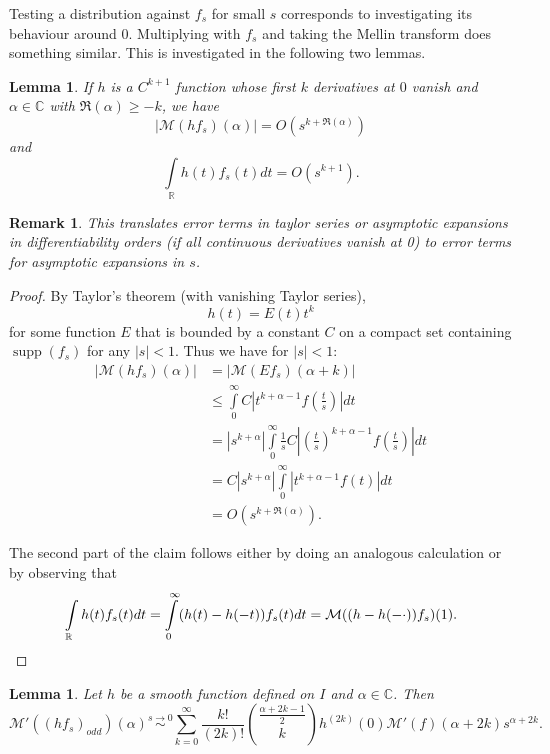 \documentclass[11pt]{article}
\def\C{{\mathbb{C}}}
\def\R{{\mathbb{R}}}
\def\insum#1{\sum\limits_{#1=0}^\infty}
\def\intR{\int\limits_\R}
\def\intP{\int\limits_0^\infty}
\def\M{\mathcal{M}}
\newtheorem{lemma}[df]{Lemma}
\newtheorem{rem}[df]{Remark}
\DeclareMathOperator{\supp}{supp}
\begin{document}
Testing a distribution against $f_s$ for small $s$ corresponds to investigating its behaviour around $0$. Multiplying with $f_s$ and taking the Mellin transform does something similar. This is investigated in the following two lemmas.
\begin{lemma}
	\label{IntRem}
	If $h$ is a $C^{k+1}$ function whose first $k$ derivatives at $0$ vanish and $\alpha\in \C$ with $\Re(\alpha)\geq -k$, we have
	\[|\M(hf_s)(\alpha)|=O(s^{k+\Re(\alpha)})\]
	and
	\[\intR h(t)f_s(t)dt=O(s^{k+1}).\]
\end{lemma}
\begin{rem}
	This translates error terms in taylor series or asymptotic expansions in differentiability orders (if all continuous derivatives vanish at 0) to error terms for asymptotic expansions in $s$. 
\end{rem}
\begin{proof}
	By Taylor's theorem (with vanishing Taylor series),
	\[h(t)= E(t)t^k\]
	for some function $E$ that is bounded by a constant $C$ on a compact set containing $\supp(f_s)$ for any $|s|<1$. Thus we have for $|s|<1$:
	\begin{align*}
		| \M (hf_s)(\alpha)|&=|\M (Ef_s)(\alpha+k)|\\
		&\leq\intP C|t^{k+\alpha-1}f\left(\tfrac{t}{s}\right)|dt\\
		&=|s^{k+\alpha}|\intP\frac{1}{s} C|\left(\tfrac{t}{s}\right)^{k+\alpha-1}f\left(\tfrac{t}{s}\right)|dt\\
		&=C|s^{k+\alpha}|\intP |t^{k+\alpha-1}f(t)|dt\\
		&=O(s^{k+\Re(\alpha)}).
	\end{align*}
	
	The second part of the claim follows either by doing an analogous calculation or by observing that
	\[\intR h(t)f_s(t)dt=\intP(h(t)-h(-t))f_s(t)dt= \M ((h-h(-\cdot))f_s)(1).\qedhere\]
\end{proof}
\begin{lemma}
	\label{MsExp}
	Let $h$ be a smooth function defined on $I$ and $\alpha\in \C$. Then
	\[\M'( (hf_s)_{odd})(\alpha)\stackrel{s\rightarrow 0}{\sim}\insum{k}\frac{k!}{(2k)!}\binom{\frac{\alpha+2k-1}{2}}{k}h^{(2k)}(0) \M'(f)(\alpha+2k)s^{\alpha+2k}.\]
\end{lemma}
\end{document}
